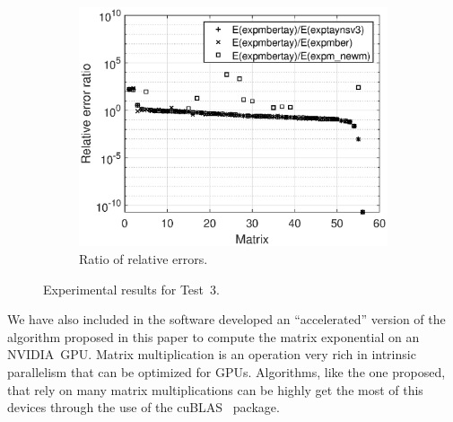 \documentclass[preprint,10pt,numbers,sort&compress]{elsarticle}
\newcommand{\nvidia}{NVIDIA}
\begin{document}
\begin{figure}[t]
\begin{subfigure}[b]{0.48\textwidth}
\label{fig:test6_b}
\vspace{12pt}
\end{subfigure}
\begin{subfigure}[b]{0.48\textwidth}
\includegraphics[scale=0.44]{Figures/error_ratio_exp_toolbox_n128_nd256-exp_eigtool_n128_nd256_expmbertay.eps}
\caption{\footnotesize Ratio of relative errors.}
\label{fig:test6_c}
\end{subfigure}
\caption{Experimental results for Test~3.}
\label{fig:test6}
\end{figure}


We have also included in the software developed an ``accelerated'' version of the algorithm proposed in this paper to compute the matrix exponential on an \nvidia\ GPU.
Matrix multiplication is an operation very rich in intrinsic parallelism that can be optimized for GPUs.  
Algorithms, like the one proposed, that rely on many matrix multiplications can be highly get the most of this devices through the use of the cuBLAS~\cite{CuLi09} package.


\end{document}
